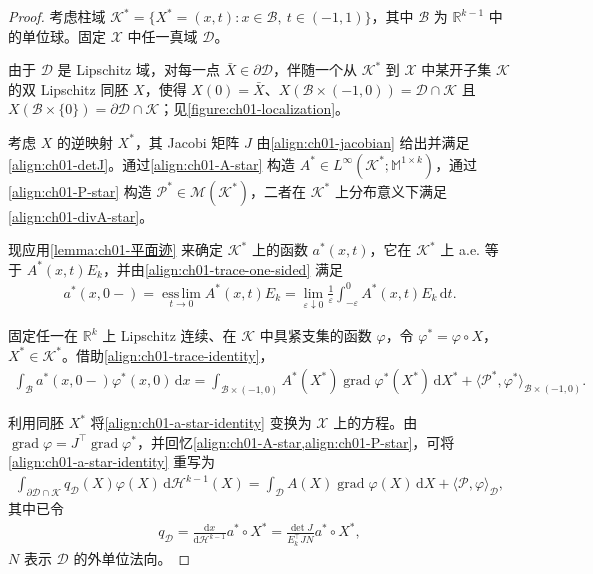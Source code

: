 \documentclass[../../main.tex]{subfiles}
\begin{document}
\begin{proof}
考虑柱域 $\mathscr{K}^{*}=\{X^{*}=(x,t):x\in\mathscr{B},\ t\in(-1,1)\}$，其中 $\mathscr{B}$ 为 $\mathbb{R}^{k-1}$ 中的单位球。固定 $\mathscr{X}$ 中任一真域 $\mathscr{D}$。

由于 $\mathscr{D}$ 是 Lipschitz 域，对每一点 $\bar{X}\in\partial\mathscr{D}$，伴随一个从 $\mathscr{K}^{*}$ 到 $\mathscr{X}$ 中某开子集 $\mathscr{K}$ 的双 Lipschitz 同胚 $X$，使得 $X(0)=\bar{X}$、$X(\mathscr{B}\times(-1,0))=\mathscr{D}\cap\mathscr{K}$ 且 $X(\mathscr{B}\times\{0\})=\partial\mathscr{D}\cap\mathscr{K}$；见\cref{figure:ch01-localization}。

考虑 $X$ 的逆映射 $X^{*}$，其 Jacobi 矩阵 $J$ 由\cref{align:ch01-jacobian} 给出并满足\cref{align:ch01-detJ}。通过\cref{align:ch01-A-star} 构造 $A^{*}\in L^{\infty}(\mathscr{K}^{*};\mathbb{M}^{1\times k})$，通过\cref{align:ch01-P-star} 构造 $\mathscr{P}^{*}\in\mathscr{M}(\mathscr{K}^{*})$，二者在 $\mathscr{K}^{*}$ 上分布意义下满足\cref{align:ch01-divA-star}。

现应用\cref{lemma:ch01-平面迹} 来确定 $\mathscr{K}^{*}$ 上的函数 $a^{*}(x,t)$，它在 $\mathscr{K}^{*}$ 上 a.e. 等于 $A^{*}(x,t)E_{k}$，并由\cref{align:ch01-trace-one-sided} 满足
\begin{align}
a^{*}(x,0-)=\operatorname*{ess\,lim}_{t\to 0}A^{*}(x,t)E_{k}=\lim_{\varepsilon\downarrow 0}\frac{1}{\varepsilon}\int_{-\varepsilon}^{0}A^{*}(x,t)E_{k}\,\mathrm{d}t.\label{align:ch01-a-star-trace}
\end{align}

固定任一在 $\mathbb{R}^{k}$ 上 Lipschitz 连续、在 $\mathscr{K}$ 中具紧支集的函数 $\varphi$，令 $\varphi^{*}=\varphi\circ X$，$X^{*}\in\mathscr{K}^{*}$。借助\cref{align:ch01-trace-identity}，
\begin{align}
\int_{\mathscr{B}}a^{*}(x,0-)\varphi^{*}(x,0)\,\mathrm{d}x=\int_{\mathscr{B}\times(-1,0)}A^{*}(X^{*})\operatorname{grad}\varphi^{*}(X^{*})\,\mathrm{d}X^{*}+\langle\mathscr{P}^{*},\varphi^{*}\rangle_{\mathscr{B}\times(-1,0)}.\label{align:ch01-a-star-identity}
\end{align}

利用同胚 $X^{*}$ 将\cref{align:ch01-a-star-identity} 变换为 $\mathscr{X}$ 上的方程。由 $\operatorname{grad}\varphi=J^{\top}\operatorname{grad}\varphi^{*}$，并回忆\cref{align:ch01-A-star,align:ch01-P-star}，可将\cref{align:ch01-a-star-identity} 重写为
\begin{align}
\int_{\partial\mathscr{D}\cap\mathscr{K}}q_{\mathscr{D}}(X)\varphi(X)\,\mathrm{d}\mathscr{H}^{k-1}(X)=\int_{\mathscr{D}}A(X)\operatorname{grad}\varphi(X)\,\mathrm{d}X+\langle\mathscr{P},\varphi\rangle_{\mathscr{D}},\label{align:ch01-local-trace}
\end{align}
其中已令
\begin{align}
q_{\mathscr{D}}=\frac{\mathrm{d}x}{\mathrm{d}\mathscr{H}^{k-1}}a^{*}\circ X^{*}=\frac{\det J}{E_{k}^{\top}JN}a^{*}\circ X^{*},\label{align:ch01-qD-formula}
\end{align}
$N$ 表示 $\mathscr{D}$ 的外单位法向。


\end{proof}
\end{document}
